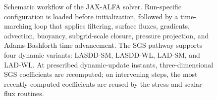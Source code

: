 \begin{figure}[t]
\begin{tikzpicture}
\end{tikzpicture}
\caption{Schematic workflow of the JAX-ALFA solver. Run-specific configuration is loaded before initialization, followed by a time-marching loop that applies filtering, surface fluxes, gradients, advection, buoyancy, subgrid-scale closure, pressure projection, and Adams-Bashforth time advancement. The SGS pathway supports four dynamic variants: LASDD-SM, LASDD-WL, LAD-SM, and LAD-WL. At prescribed dynamic-update instants, three-dimensional SGS coefficients are recomputed; on intervening steps, the most recently computed coefficients are reused by the stress and scalar-flux routines.}
\label{fig:jaxalfa-codebase-flowchart}
\end{figure}

